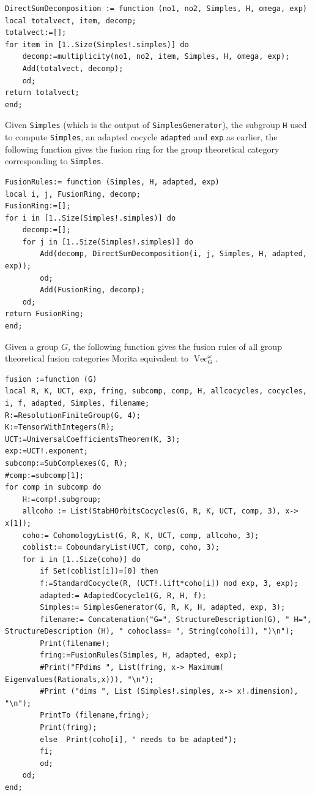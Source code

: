 \documentclass[11pt]{book}
\theoremstyle{Rem}
\theoremstyle{definition}
\numberwithin{equation}{section}
\newcommand\lstl{\lstinline}
\newcommand\Vect{\operatorname{Vec}}
\begin{document}
\begin{lstlisting}
DirectSumDecomposition := function (no1, no2, Simples, H, omega, exp)
local totalvect, item, decomp;
totalvect:=[];
for item in [1..Size(Simples!.simples)] do
 	decomp:=multiplicity(no1, no2, item, Simples, H, omega, exp);
 	Add(totalvect, decomp); 
 	od;
return totalvect;
end;
\end{lstlisting}
Given \lstl{Simples} (which is the output of \lstl{SimplesGenerator}), the subgroup \lstl{H} used to compute \lstl{Simples}, an adapted cocycle \lstl{adapted} and \lstl{exp} as earlier, the following function gives the fusion ring for the group theoretical category corresponding to \lstl{Simples}.
\begin{lstlisting}
FusionRules:= function (Simples, H, adapted, exp)
local i, j, FusionRing, decomp;
FusionRing:=[];
for i in [1..Size(Simples!.simples)] do
	decomp:=[];
	for j in [1..Size(Simples!.simples)] do
		Add(decomp, DirectSumDecomposition(i, j, Simples, H, adapted, exp)); 
		od;
		Add(FusionRing, decomp);
	od;
return FusionRing;
end;

\end{lstlisting}
Given a group $G$, the following function gives the fusion rules of all group theoretical fusion categories Morita equivalent to $\Vect_G^\omega$.
\begin{lstlisting}
fusion :=function (G)
local R, K, UCT, exp, fring, subcomp, comp, H, allcocycles, cocycles, i, f, adapted, Simples, filename;
R:=ResolutionFiniteGroup(G, 4);
K:=TensorWithIntegers(R);
UCT:=UniversalCoefficientsTheorem(K, 3);
exp:=UCT!.exponent;
subcomp:=SubComplexes(G, R);
#comp:=subcomp[1];
for comp in subcomp do
	H:=comp!.subgroup;
	allcoho := List(StabHOrbitsCocycles(G, R, K, UCT, comp, 3), x-> x[1]);
	coho:= CohomologyList(G, R, K, UCT, comp, allcoho, 3);
	coblist:= CoboundaryList(UCT, comp, coho, 3);
	for i in [1..Size(coho)] do
		if Set(coblist[i])=[0] then 	
		f:=StandardCocycle(R, (UCT!.lift*coho[i]) mod exp, 3, exp);
		adapted:= AdaptedCocycle1(G, R, H, f);
		Simples:= SimplesGenerator(G, R, K, H, adapted, exp, 3);
		filename:= Concatenation("G=", StructureDescription(G), " H=", StructureDescription (H), " cohoclass= ", String(coho[i]), ")\n"); 
		Print(filename);
		fring:=FusionRules(Simples, H, adapted, exp);
		#Print("FPdims ", List(fring, x-> Maximum( Eigenvalues(Rationals,x))), "\n");
		#Print ("dims ", List (Simples!.simples, x-> x!.dimension), "\n");
		PrintTo (filename,fring);
		Print(fring);
		else  Print(coho[i], " needs to be adapted");
		fi;
		od;
	od;
end;
\end{lstlisting}
\end{document}
